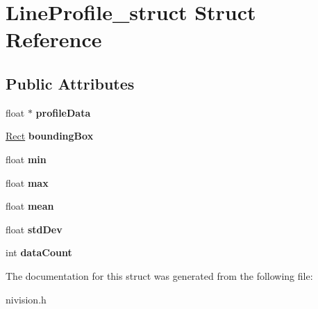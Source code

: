 \hypertarget{structLineProfile__struct}{
\section{LineProfile\_\-struct Struct Reference}
\label{structLineProfile__struct}
}
\subsection*{Public Attributes}
\begin{DoxyCompactItemize}
\item 
\hypertarget{structLineProfile__struct_a000fbe99a086411f95bccac70642cfd1}{
float $\ast$ {\bfseries profileData}}
\label{structLineProfile__struct_a000fbe99a086411f95bccac70642cfd1}

\item 
\hypertarget{structLineProfile__struct_a3cff006ee59a4b0d374e246f563c4b11}{
\hyperlink{structRect__struct}{Rect} {\bfseries boundingBox}}
\label{structLineProfile__struct_a3cff006ee59a4b0d374e246f563c4b11}

\item 
\hypertarget{structLineProfile__struct_ab3e1b654a4aa528b6a972aa5aa3b7e16}{
float {\bfseries min}}
\label{structLineProfile__struct_ab3e1b654a4aa528b6a972aa5aa3b7e16}

\item 
\hypertarget{structLineProfile__struct_a0a9e3bef423bac80f4ab8a72fb9f261c}{
float {\bfseries max}}
\label{structLineProfile__struct_a0a9e3bef423bac80f4ab8a72fb9f261c}

\item 
\hypertarget{structLineProfile__struct_a9cc8f7ae8ca8048de1904f77fa3507ab}{
float {\bfseries mean}}
\label{structLineProfile__struct_a9cc8f7ae8ca8048de1904f77fa3507ab}

\item 
\hypertarget{structLineProfile__struct_ad2cf684f4753aec341efb718e9846bd2}{
float {\bfseries stdDev}}
\label{structLineProfile__struct_ad2cf684f4753aec341efb718e9846bd2}

\item 
\hypertarget{structLineProfile__struct_a6da5e04511833722b01ffdf7130ec32b}{
int {\bfseries dataCount}}
\label{structLineProfile__struct_a6da5e04511833722b01ffdf7130ec32b}

\end{DoxyCompactItemize}


The documentation for this struct was generated from the following file:\begin{DoxyCompactItemize}
\item 
nivision.h\end{DoxyCompactItemize}
